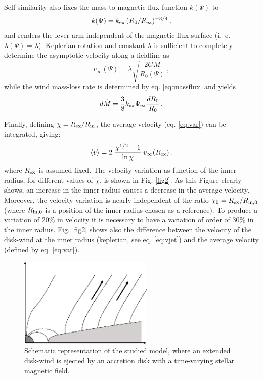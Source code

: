 \documentclass{emulateapj}
\begin{document}
Self-similarity also fixes the mass-to-magnetic flux function $k(\Psi)$ to
\begin{equation}
  k(\Psi) = k_{\rm ex} \, (R_0/R_{\rm ex})^{-3/4} \,,
  \label{eq:k}
\end{equation}
%
and renders the lever arm independent of the magnetic
flux surface (i.~e. $\lambda(\Psi) = \lambda$).
%
Keplerian rotation
and constant $\lambda$ is sufficient to completely determine the
asymptotic velocity along a fieldline as
\begin{equation} \label{eq:vjet}
  v_{\infty}(\Psi) 
  = \lambda \sqrt{\frac{2GM}{R_0(\Psi)}} \,,
\end{equation}
while
the wind mass-loss rate is determined by eq. \ref{eq:massflux} and yields
\begin{equation}
 d\dot{M}=\frac{3}{8} k_{\rm ex} \Psi_{\rm ex} \frac{d R_0}{R_0} \,.
 \label{eq:mdot}
\end{equation}
%


Finally, defining $\chi = R_{\rm ex}/R_{\rm in}$, the average velocity (eq. \ref{eq:var}) 
can be integrated, giving:
%
\begin{equation}\label{eq:vmean}
  \langle v \rangle =  2 \; 
  \frac{\chi^{1/2}-1}{\ln\chi} \; v_\infty(R_{\rm ex}) \,.
\end{equation}
%
where $R_{\rm ex}$ is assumed fixed.
The velocity variation as function of the inner radius,
for different values of $\chi$, is shown in Fig. \ref{fig2}.
 As this Figure clearly shows, an increase in the inner radius causes a 
decrease in the average velocity.
Moreover, the velocity variation is nearly independent of the ratio 
$\chi_0=R_{\rm ex}/R_{\rm in,0}$ (where $R_{\rm in,0}$ is a position 
of the inner radius chosen as a reference).
To produce a variation of 20\% in velocity it is necessary to have a variation
of order of 30\% in the inner radius.
Fig. \ref{fig2} shows also the difference between the velocity of the disk-wind 
at the inner radius (keplerian, see eq. \ref{eq:vjet}) and the 
average velocity (defined by eq. \ref{eq:var}).

\begin{figure}
 \centering
 \includegraphics[width=64mm]{f2.eps}
  \caption{Schematic representation of the 
          studied model, where an extended disk-wind is 
          ejected by an accretion disk with a time-varying
          stellar magnetic field.}
  \label{fig1}
\end{figure}
\end{document}
